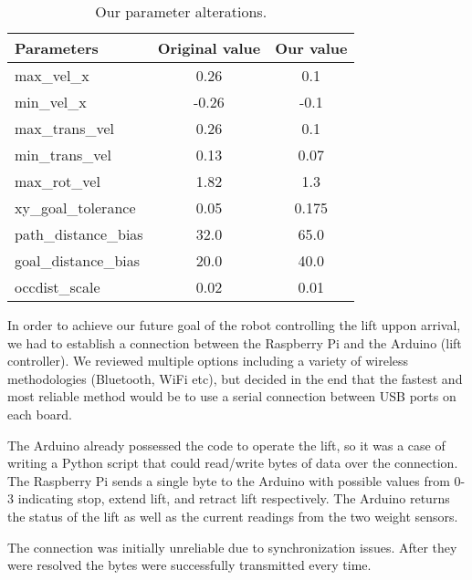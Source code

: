 \documentclass{article}
\begin{document}
\begin{table}[h]
\vskip 3mm
\begin{center}
\begin{small}
\begin{sc}
\begin{tabular}{lcc}
\hline
\abovespace\belowspace
Parameters & Original value & Our value \\
\hline
  max\_vel\_x & 0.26 & 0.1 \\
  min\_vel\_x & -0.26 & -0.1 \\
  max\_trans\_vel & 0.26 & 0.1 \\
  min\_trans\_vel & 0.13 & 0.07 \\
  max\_rot\_vel & 1.82 & 1.3 \\
  xy\_goal\_tolerance & 0.05 & 0.175 \\
  path\_distance\_bias & 32.0 & 65.0 \\
  goal\_distance\_bias & 20.0 & 40.0 \\
  occdist\_scale & 0.02 & 0.01
\end{tabular}
\end{sc}
\end{small}
\caption{Our parameter alterations.}
\label{tab:params}
\end{center}
\vskip -3mm
\end{table}

In order to achieve our future goal of the robot controlling the lift uppon arrival, we had to establish a connection between the Raspberry Pi and the Arduino (lift controller). We reviewed multiple options including a variety of wireless methodologies (Bluetooth, WiFi etc), but decided in the end that the fastest and most reliable method would be to use a serial connection between USB ports on each board.

The Arduino already possessed the code to operate the lift, so it was a case of writing a Python script that could read/write bytes of data over the connection. The Raspberry Pi sends a single byte to the Arduino with possible values from 0-3 indicating stop, extend lift, and retract lift respectively. The Arduino returns the status of the lift as well as the current readings from the two weight sensors.

The connection was initially unreliable due to synchronization issues. After they were resolved the bytes were successfully transmitted every time.
\end{document}
